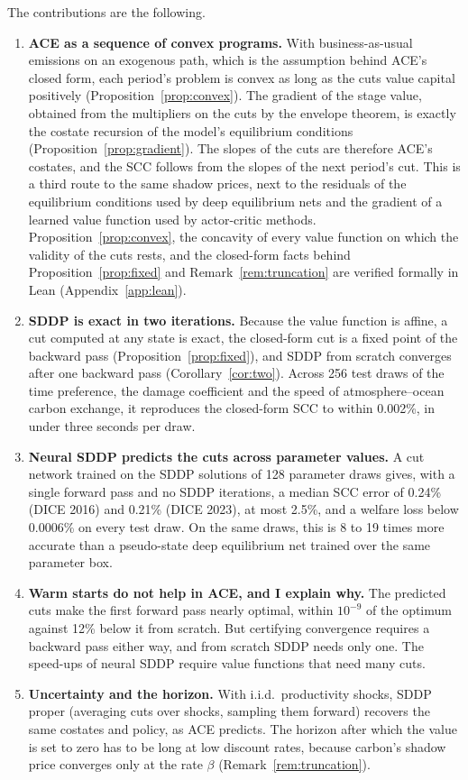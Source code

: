 The contributions are the following.

\begin{enumerate}
    \item \textbf{ACE as a sequence of convex programs.} With business-as-usual emissions on an exogenous path, which is the assumption behind ACE's closed form, each period's problem is convex as long as the cuts value capital positively (Proposition~\ref{prop:convex}). The gradient of the stage value, obtained from the multipliers on the cuts by the envelope theorem, is exactly the costate recursion of the model's equilibrium conditions (Proposition~\ref{prop:gradient}). The slopes of the cuts are therefore ACE's costates, and the SCC follows from the slopes of the next period's cut. This is a third route to the same shadow prices, next to the residuals of the equilibrium conditions used by deep equilibrium nets and the gradient of a learned value function used by actor-critic methods. Proposition~\ref{prop:convex}, the concavity of every value function on which the validity of the cuts rests, and the closed-form facts behind Proposition~\ref{prop:fixed} and Remark~\ref{rem:truncation} are verified formally in Lean (Appendix~\ref{app:lean}).
    \item \textbf{SDDP is exact in two iterations.} Because the value function is affine, a cut computed at any state is exact, the closed-form cut is a fixed point of the backward pass (Proposition~\ref{prop:fixed}), and SDDP from scratch converges after one backward pass (Corollary~\ref{cor:two}). Across 256 test draws of the time preference, the damage coefficient and the speed of atmosphere--ocean carbon exchange, it reproduces the closed-form SCC to within 0.002\%, in under three seconds per draw.
    \item \textbf{Neural SDDP predicts the cuts across parameter values.} A cut network trained on the SDDP solutions of 128 parameter draws gives, with a single forward pass and no SDDP iterations, a median SCC error of 0.24\% (DICE 2016) and 0.21\% (DICE 2023), at most 2.5\%, and a welfare loss below 0.0006\% on every test draw. On the same draws, this is 8 to 19 times more accurate than a pseudo-state deep equilibrium net trained over the same parameter box.
    \item \textbf{Warm starts do not help in ACE, and I explain why.} The predicted cuts make the first forward pass nearly optimal, within $10^{-9}$ of the optimum against 12\% below it from scratch. But certifying convergence requires a backward pass either way, and from scratch SDDP needs only one. The speed-ups of neural SDDP require value functions that need many cuts.
    \item \textbf{Uncertainty and the horizon.} With i.i.d.\ productivity shocks, SDDP proper (averaging cuts over shocks, sampling them forward) recovers the same costates and policy, as ACE predicts. The horizon after which the value is set to zero has to be long at low discount rates, because carbon's shadow price converges only at the rate $\beta$ (Remark~\ref{rem:truncation}).
\end{enumerate}


